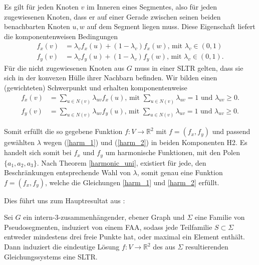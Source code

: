 Es gilt für jeden Knoten $v$ im Inneren eines Segmentes, also für jeden zugewiesenen Knoten, dass er auf einer Gerade zwischen seinen beiden benachbarten Knoten $u,w$ auf dem Segment liegen muss. Diese Eigenschaft liefert die komponentenweisen Bedingungen 
\begin{equation}\label{harm_1}
\begin{split}
f_x(v) &= \lambda_v f_x(u) + (1-\lambda_v)f_x(w) \text{, mit } \lambda_v \in (0,1)\\
f_y(v) &= \lambda_v f_y(u) + (1-\lambda_v)f_y(w) \text{, mit } \lambda_v \in (0,1).
\end{split}
\end{equation}
Für die nicht zugewiesenen Knoten aus $G$ muss in einer SLTR gelten, dass sie sich in der konvexen Hülle ihrer Nachbarn befinden. Wir bilden einen (gewichteten) Schwerpunkt und erhalten komponentenweise 
\begin{equation}\label{harm_2}
\begin{split}
f_x(v) &= \sum_{u \in N(v)} \lambda_{uv} f_x(u) \text{, mit }  \sum_{u \in N(v)}\lambda_{uv} = 1 \text{ und } \lambda_{uv} \geq 0.\\
f_y(v) &= \sum_{u \in N(v)} \lambda_{uv} f_y(u) \text{, mit }  \sum_{u \in N(v)}\lambda_{uv} = 1 \text{ und } \lambda_{uv} \geq 0.
\end{split}
\end{equation}

Somit erfüllt die so gegebene Funktion $f:V\to\mathbb{R}^2$ mit $f=(f_x,f_y)$ und passend gewählten $\lambda$ wegen (\ref{harm_1}) und (\ref{harm_2}) in beiden Komponenten H2. Es handelt sich somit bei $f_x$ und $f_y$ um harmonische Funktionen, mit den Polen $\{a_1,a_2,a_3\}$. Nach Theorem \ref{harmonic_uni}, existiert für jede, den Beschränkungen entsprechende Wahl von $\lambda$, somit genau eine Funktion $f=(f_x,f_y)$, welche die Gleichungen \ref{harm_1} und \ref{harm_2} erfüllt.

Dies führt uns zum Hauptresultat aus \cite{af13}:

\begin{theorem}\label{com_theo}
Sei $G$ ein intern-3-zusammenhängender, ebener Graph und $\Sigma$ eine Familie von Pseudosegmenten, induziert von einem FAA, sodass jede Teilfamilie $S \subset \Sigma$ entweder mindestens drei freie Punkte hat, oder maximal ein Element enthält. Dann induziert die eindeutige Lösung $f:V\to \mathbb{R}^2$ des aus $\Sigma$ resultierenden Gleichungssystems eine SLTR. 
\end{theorem}

